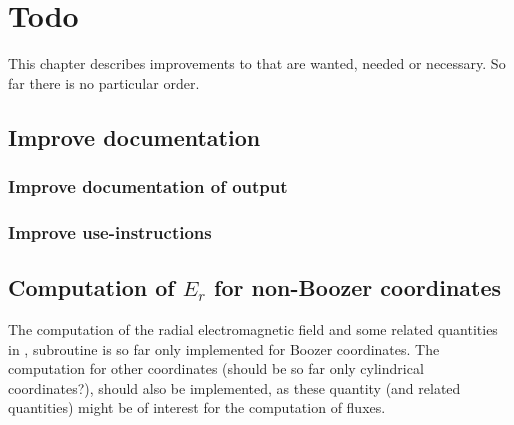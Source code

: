 \chapter{Todo}
This chapter describes improvements to \neotwo that are wanted, needed
or necessary.
So far there is no particular order.

\section{Improve documentation}
\subsection{Improve documentation of output}
\subsection{Improve use-instructions}

\section{Computation of $E_r$ for non-Boozer coordinates}
The computation of the radial electromagnetic field and some related
quantities in , subroutine
 is so far only implemented for Boozer
coordinates.
The computation for other coordinates (should be so far only cylindrical
coordinates?), should also be implemented, as these quantity (and
related quantities) might be of interest for the computation of fluxes.

\section{}
